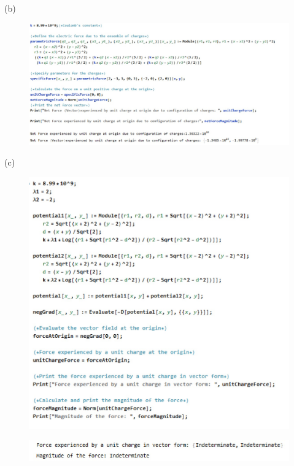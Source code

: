 \documentclass[journal,12pt,onecolumn]{IEEEtran}
\theoremstyle{remark}
\begin{document}
(b) \begin{figure}[H]
    \centering
     \includegraphics[scale=0.5]{figs/f2.jpeg}
    \caption{}    
    \label{fig:ishitha.em.fig1}
   \end{figure} 
   \newpage   
(c)  \begin{figure}[H]
    \centering
     \includegraphics[scale=0.5]{figs/f3.jpeg}
    \caption{}    
    \label{fig:ishitha.em.fig1}
   \end{figure}   
    \begin{figure}[H]
    \centering
     \includegraphics[scale=0.5]{figs/f3o.jpeg}
    \caption{}    
    \label{fig:ishitha.em.fig1}
   \end{figure}    
   
\end{document}

